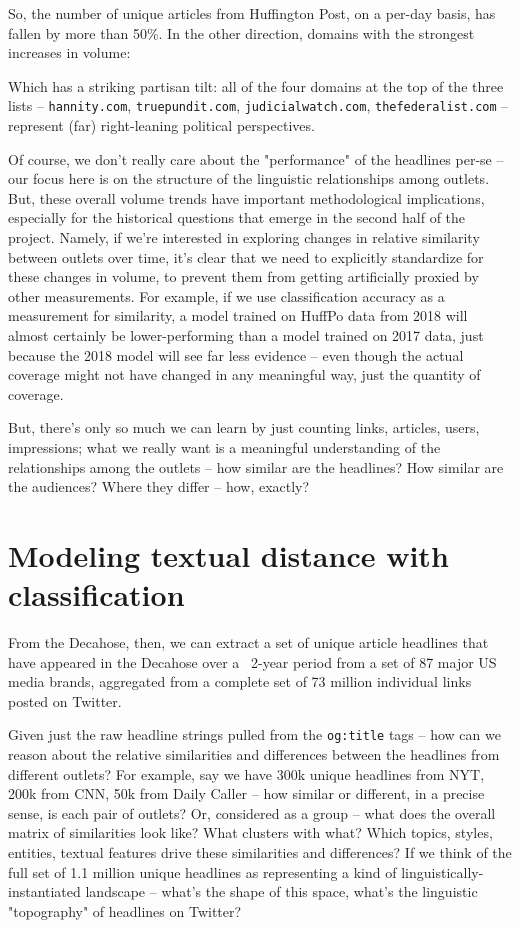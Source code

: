 \documentclass{scrartcl}
\begin{document}

So, the number of unique articles from Huffington Post, on a per-day basis, has fallen by more than 50\%. In the other direction, domains with the strongest increases in volume:


Which has a striking partisan tilt: all of the four domains at the top of the three lists -- \texttt{hannity.com}, \texttt{truepundit.com}, \texttt{judicialwatch.com}, \texttt{thefederalist.com} -- represent (far) right-leaning political perspectives.

Of course, we don't really care about the "performance" of the headlines per-se -- our focus here is on the structure of the linguistic relationships among outlets. But, these overall volume trends have important methodological implications, especially for the historical questions that emerge in the second half of the project. Namely, if we're interested in exploring changes in relative similarity between outlets over time, it's clear that we need to explicitly standardize for these changes in volume, to prevent them from getting artificially proxied by other measurements. For example, if we use classification accuracy as a measurement for similarity, a model trained on HuffPo data from 2018 will almost certainly be lower-performing than a model trained on 2017 data, just because the 2018 model will see far less evidence -- even though the actual coverage might not have changed in any meaningful way, just the quantity of coverage.

But, there's only so much we can learn by just counting links, articles, users, impressions; what we really want is a meaningful understanding of the relationships among the outlets -- how similar are the headlines? How similar are the audiences? Where they differ -- how, exactly?

\section{Modeling textual distance with classification}

From the Decahose, then, we can extract a set of unique article headlines that have appeared in the Decahose over a ~2-year period from a set of 87 major US media brands, aggregated from a complete set of 73 million individual links posted on Twitter.

Given just the raw headline strings pulled from the \texttt{og:title} tags -- how can we reason about the relative similarities and differences between the headlines from different outlets? For example, say we have 300k unique headlines from NYT, 200k from CNN, 50k from Daily Caller -- how similar or different, in a precise sense, is each pair of outlets? Or, considered as a group -- what does the overall matrix of similarities look like? What clusters with what? Which topics, styles, entities, textual features drive these similarities and differences? If we think of the full set of 1.1 million unique headlines as representing a kind of linguistically-instantiated landscape -- what's the shape of this space, what's the linguistic "topography" of headlines on Twitter?
\end{document}
